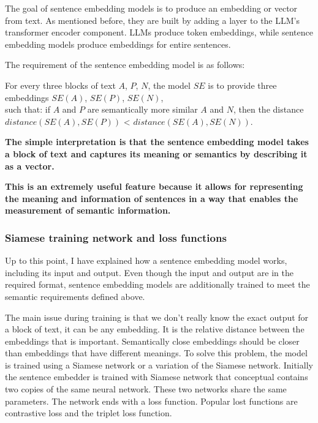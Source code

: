 \documentclass{wseas}
\begin{document}
The goal of sentence embedding models is to produce an embedding or
vector from text. As mentioned before, they are built by adding a layer
to the LLM's transformer encoder component. LLMs produce token
embeddings, while sentence embedding models produce embeddings for
entire sentences.

The requirement of the sentence embedding model is as follows:

For every three blocks of text \(A\), \(P\), \(N\), the model \(SE\) is
to provide three embeddings \(SE(A)\), \(SE(P)\), \(SE(N)\),\\
such that: if \(A\) and \(P\) are semantically more similar \(A\) and
\(N\), then the distance \(distance(SE(A), SE(P))\) \textless{}
\(distance(SE(A), SE(N))\).

\textbf{The simple interpretation is that the sentence embedding model
takes a block of text and captures its meaning or semantics by
describing it as a vector.}

\textbf{This is an extremely useful feature because it allows for
representing the meaning and information of sentences in a way that
enables the measurement of semantic information.}

\subsubsection{Siamese training network and loss functions}

Up to this point, I have explained how a sentence embedding model works,
including its input and output. Even though the input and output are in
the required format, sentence embedding models are additionally trained
to meet the semantic requirements defined above.

The main issue during training is that we don't really know the exact
output for a block of text, it can be any embedding. It is the relative
distance between the embeddings that is important. Semantically close
embeddings should be closer than embeddings that have different
meanings. To solve this problem, the model is trained using a Siamese
network or a variation of the Siamese network. Initially the sentence
embedder is trained with Siamese network that conceptual contains two
copies of the same neural network. These two networks share the same
parameters. The network ends with a loss function. Popular lost
functions are contrastive loss and the triplet loss function.
\end{document}
